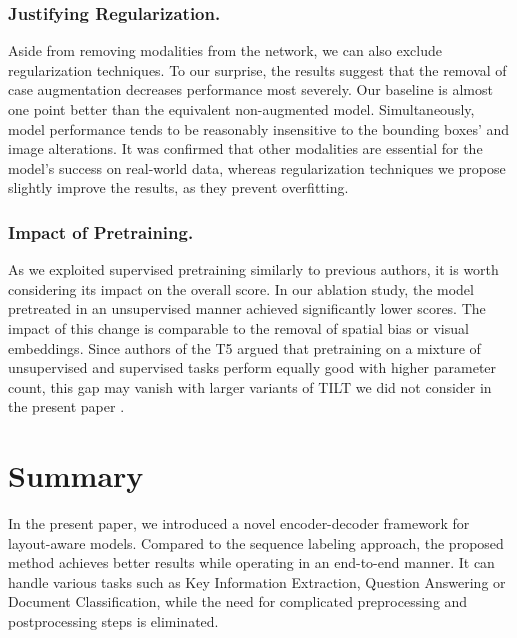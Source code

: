 \documentclass[runningheads]{llncs}
\begin{document}
\subsubsection{Justifying Regularization.} Aside from removing modalities from the network, we can also exclude regularization techniques.
To our surprise, the results suggest that the removal of case augmentation decreases performance most severely. Our baseline is almost one point better than the equivalent non-augmented model.
Simultaneously, model performance tends to be reasonably insensitive to the bounding boxes' and image alterations.
It was confirmed that other modalities are essential for the model's success on real-world data, whereas regularization techniques we propose slightly improve the results, as they prevent overfitting.

\subsubsection{Impact of Pretraining.} As we exploited supervised pretraining similarly to previous authors, it is worth considering its impact on the overall score. In our ablation study, the model pretreated in an unsupervised manner achieved significantly lower scores. The impact of this change is comparable to the removal of spatial bias or visual embeddings. Since authors of the T5 argued that pretraining on a mixture of unsupervised and supervised tasks perform equally good with higher parameter count, this gap may vanish with larger variants of TILT we did not consider in the present paper \cite{2020t5}.













\section{Summary}

In the present paper, we introduced a novel encoder-decoder framework for layout-aware models. Compared to the sequence labeling approach, the proposed method achieves better results while operating in an end-to-end manner. It can handle various tasks such as Key Information Extraction, Question Answering or Document Classification, while the need for complicated preprocessing and postprocessing steps is eliminated.
\end{document}
